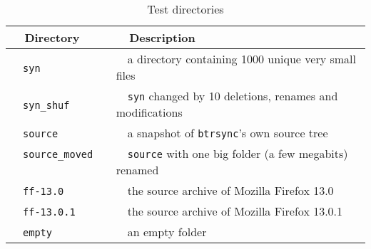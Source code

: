 \documentclass[twoside,envcountsame,runningheads]{llncs}
\newcommand{\btrsync}{\texttt{btrsync}\xspace}
\newcommand{\rsync}{\texttt{rsync}\xspace}
\def\fullversion{0} %
\newcommand{\full}[2]{%
\ifnum\fullversion=1%
#1%
\else%
#2%
\fi}
\begin{document}
\begin{table}[t]
\centering
  \caption{Test directories}
  \label{tab:benchdirec}
\begin{tabular}{ll}\toprule
~~{\bf Directory}              ~~&~~{\bf Description}\\\midrule
~~{\tt syn}              ~~&~~a directory containing 1000 unique very small files\\
~~{\tt syn\_shuf}    ~~&~~{\tt syn} changed by 10 deletions, renames and modifications \\
~~{\tt source}                 ~~& ~~a snapshot of \btrsync's own source tree \\
~~{\tt source\_moved}          ~~& ~~{\tt source} with one big folder (a few megabits) renamed\\
~~{\tt ff-13.0}           ~~& ~~the source archive of Mozilla Firefox 13.0\\
~~{\tt ff-13.0.1}         ~~& ~~the source archive of Mozilla Firefox 13.0.1\\
~~{\tt empty}                  ~~& ~~an empty folder\\\bottomrule
\end{tabular}\smallskip
\end{table}

\end{document}
